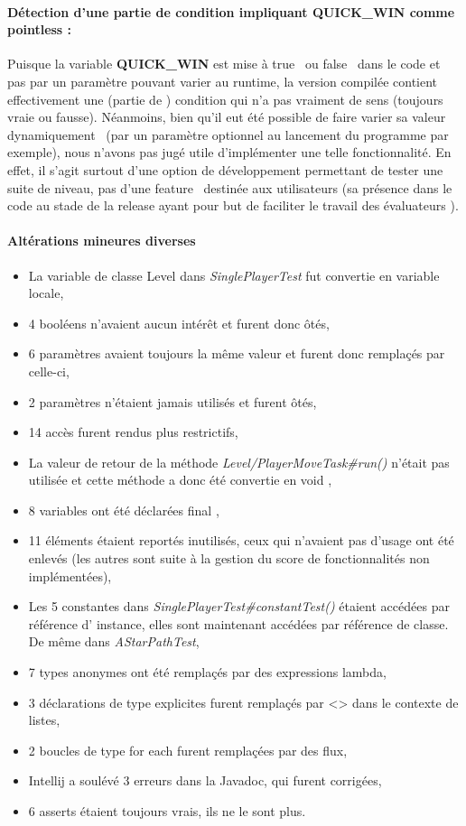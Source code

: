 \documentclass[12pt, openany]{report}
\begin{document}
\paragraph{Détection d'une partie de condition impliquant QUICK\_WIN comme \og pointless \fg : } 
Puisque la variable \textbf{QUICK\_WIN} est mise à \og true \fg \, ou \og false \fg \, dans le code et pas par un paramètre pouvant varier au runtime, la version compilée contient effectivement une (partie de ) condition qui n'a pas vraiment de sens (toujours vraie ou fausse).
Néanmoins, bien qu'il eut été possible de faire varier sa valeur \og dynamiquement \fg \, (par un paramètre optionnel au lancement du programme par exemple), nous n'avons pas jugé utile d'implémenter une telle fonctionnalité. En effet, il s'agit surtout d'une option de développement permettant de tester une suite de niveau, pas d'une \og feature \fg \, destinée aux utilisateurs (sa présence dans le code au stade de la release ayant pour but de faciliter le travail des \og évaluateurs \fg).
\paragraph{Altérations mineures diverses}

\begin{itemize}
	\item La variable de classe \og Level \fg{} dans \mbox{\textit{SinglePlayerTest}} fut convertie en variable locale,
	\item 4 booléens n'avaient aucun intérêt et furent donc ôtés,
	\item 6 paramètres avaient toujours la même valeur et furent donc remplaçés par celle-ci,
	\item 2 paramètres n'étaient jamais utilisés et furent ôtés,
	\item 14 accès furent rendus plus restrictifs,
	\item La valeur de retour de la méthode \mbox{\textit{Level/PlayerMoveTask\#run()}} n'était pas utilisée et cette méthode a donc été convertie en \og void \fg{},
	\item 8 variables ont été déclarées \og final \fg{},
	\item 11 éléments étaient reportés inutilisés, ceux qui n'avaient pas d'usage ont été enlevés (les autres sont suite à la gestion du score de fonctionnalités non implémentées),
	\item Les 5 constantes dans \mbox{\textit{SinglePlayerTest\#constantTest()}} étaient accédées par référence d' instance, elles sont maintenant accédées par référence de classe. De même dans \mbox{\textit{AStarPathTest}},
	\item 7 types anonymes ont été remplaçés par des expressions lambda,
	\item 3 déclarations de type explicites furent remplaçés par \og <> \fg{} dans le contexte de listes,
	\item 2 boucles de type \og for each \fg{} furent remplaçées par des flux,
	\item Intellij a soulévé 3 erreurs dans la Javadoc, qui furent corrigées,
	\item 6 \og asserts \fg{} étaient toujours vrais, ils ne le sont plus.
\end{itemize}
\end{document}
